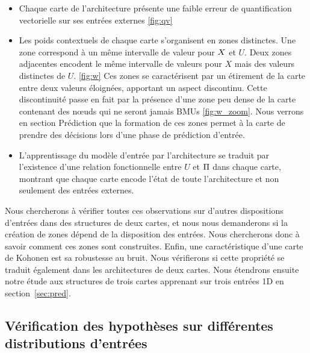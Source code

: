 \documentclass[../main]{subfiles}
\begin{document}
\begin{itemize}
	\item Chaque carte de l'architecture présente une faible erreur de quantification vectorielle sur ses entrées externes \ref{fig:qv}
	\item Les poids contextuels de chaque carte s'organisent en zones distinctes. Une zone correspond à un même intervalle de valeur pour $X$ et $U$. Deux zones adjacentes encodent le même intervalle de valeurs pour $X$ mais des valeurs distinctes de $U$. \ref{fig:w} Ces zones se caractérisent par un étirement de la carte entre deux valeurs éloignées, apportant un aspect discontinu. Cette discontinuité passe en fait par la présence d'une zone peu dense de la carte contenant des n\oe{}uds qui ne seront jamais BMUs \ref{fig:w_zoom}. Nous verrons en section Prédiction que la formation de ces zones permet à la carte de prendre des décisions lors d'une phase de prédiction d'entrée.
	\item L'apprentissage du modèle d'entrée par l'architecture se traduit par l'existence d'une relation fonctionnelle entre $U$ et $\Pi$ dans chaque carte, montrant que chaque carte encode l'état de toute l'architecture et non seulement des entrées externes.
\end{itemize}

Nous chercherons à vérifier toutes ces observations sur d'autres dispositions d'entrées dans des structures de deux cartes, et nous nous demanderons si la création de zones dépend de la disposition des entrées. Nous chercherons donc à savoir comment ces zones sont construites. Enfin, une caractéristique d'une carte de Kohonen est sa robustesse au bruit. Nous vérifierons si cette propriété se traduit également dans les architectures de deux cartes.
Nous étendrons ensuite notre étude aux structures de trois cartes apprenant sur trois entrées 1D en section~\ref{sec:pred}.





\subsection{Vérification des hypothèses sur différentes distributions d'entrées}
\end{document}
